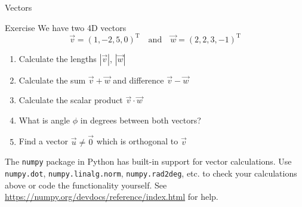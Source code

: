   \begin{frame}{Vectors}
    \begin{exampleblock}{Exercise}
      We have two 4D vectors
      \begin{equation*}
        \vec{v} = \left(1, -2, 5, 0\right)^\mathrm{T}
        \quad\mathrm{and}\quad
        \vec{w} = \left(2, 2, 3, -1\right)^\mathrm{T}
      \end{equation*}
      \begin{enumerate}
        \item Calculate the lengths $|\vec{v}|$, $|\vec{w}|$
        \item Calculate the sum $\vec{v} + \vec{w}$ and difference $\vec{v} - \vec{w}$
        \item Calculate the scalar product $\vec{v}\cdot \vec{w}$
        \item What is angle $\phi$ in degrees between both vectors?
        \item Find a vector $\vec{u}\neq \vec{0}$ which is orthogonal to $\vec{v}$
      \end{enumerate}
      The \texttt{numpy} package in Python has built-in support for vector
      calculations.
      Use \texttt{numpy.dot}, \texttt{numpy.linalg.norm},
      \texttt{numpy.rad2deg}, etc. to check your calculations above or code the
      functionality yourself.
      See \url{https://numpy.org/devdocs/reference/index.html} for help.
    \end{exampleblock}
  \end{frame}


